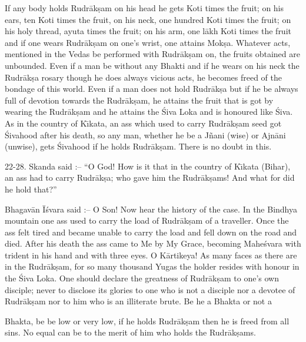 If any body holds Rudr\=ak\d{s}am on his head he gets Koti times the fruit; on his ears, ten Koti times the fruit, on his neck, one hundred Koti times the fruit; on his holy thread, ayuta times the fruit; on his arm, one l\=akh Koti times the fruit and if one wears Rudr\=ak\d{s}am on one's wrist, one attains Mok\d{s}a. Whatever acts, mentioned in the Vedas be performed with Rudr\=ak\d{s}am on, the fruits obtained are unbounded. Even if a man be without any Bhakti and if he wears on his neck the Rudr\=ak\d{s}a rosary though he does always vicious acts, he becomes freed of the bondage of this world. Even if a man does not hold Rudr\=ak\d{s}a but if he be always full of devotion towards the Rudr\=ak\d{s}am, he attains the fruit that is got by wearing the Rudr\=ak\d{s}am and he attains the \'Siva Loka and is honoured like \'Siva. As in the country of K\={\i}kata, an ass which used to carry Rudr\=ak\d{s}am seed got \'Sivahood after his death, so any man, whether he be a J\~nani (wise) or Ajn\=ani (unwise), gets \'Sivahood if he holds Rudr\=ak\d{s}am. There is no doubt in this.

22-28. Skanda said :-- ``O God! How is it that in the country of K\={\i}kata (Bihar), an ass had to carry Rudr\=ak\d{s}a; who gave him the Rudr\=ak\d{s}ams! And what for did he hold that?''

Bhagav\=an \=I\'svara said :-- O Son! Now hear the history of the case. In the Bindhya mountain one ass used to carry the load of Rudr\=ak\d{s}am of a traveller. Once the ass felt tired and became unable to carry the load and fell down on the road and died. After his death the ass came to Me by My Grace, becoming Mahe\'svara with trident in his hand and with three eyes. O K\=artikeya! As many faces as there are in the Rudr\=ak\d{s}am, for so many thousand Yugas the holder resides with honour in the \'Siva Loka. One should declare the greatness of Rudr\=ak\d{s}am to one's own disciple; never to disclose its glories to one who is not a disciple nor a devotee of Rudr\=ak\d{s}am nor to him who is an illiterate brute. Be he a Bhakta or not a

Bhakta, be be low or very low, if he holds Rudr\=ak\d{s}am then he is freed from all sins. No equal can be to the merit of him who holds the Rudr\=ak\d{s}ams.

